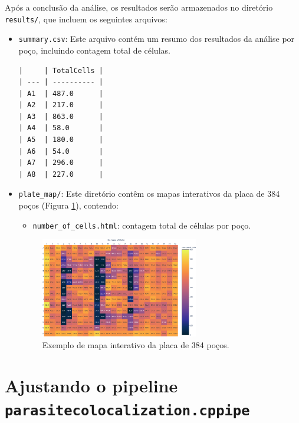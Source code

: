 \documentclass{article}
\begin{document}
Após a conclusão da análise, os resultados serão armazenados no diretório \texttt{results/}, que incluem os seguintes arquivos:

\begin{itemize}
  \item \texttt{summary.csv}: Este arquivo contém um resumo dos resultados da análise por poço, incluindo contagem total de células.

\begin{verbatim}
|     | TotalCells |
| --- | ---------- |
| A1  | 487.0      |
| A2  | 217.0      |
| A3  | 863.0      |
| A4  | 58.0       |
| A5  | 180.0      |
| A6  | 54.0       |
| A7  | 296.0      |
| A8  | 227.0      |
\end{verbatim}
  
  \item \texttt{plate\_map/}: Este diretório contêm os mapas interativos da placa de 384 poços (Figura \ref{fig:plate_map}), contendo:

  \begin{itemize}
    \item \texttt{number\_of\_cells.html}: contagem total de células por poço.
  \end{itemize}

  \begin{figure}[H]
    \centering
    \includegraphics[width=0.65\textwidth]{images/example_plate_map.png}
    \caption{Exemplo de mapa interativo da placa de 384 poços.}
    \label{fig:plate_map}
  \end{figure}

\end{itemize}

\section{Ajustando o pipeline \texttt{parasitecolocalization.cppipe}}

\printbibliography
\end{document}
